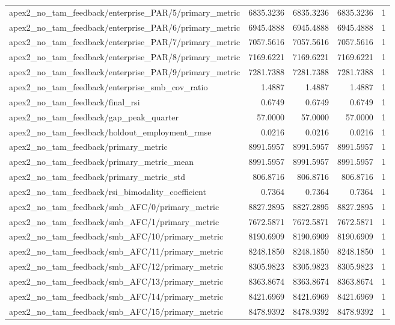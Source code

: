 \begin{table}[h]
\begin{tabular}{lrrrr}
apex2_no_tam_feedback/enterprise_PAR/5/primary_metric & 6835.3236 & 6835.3236 & 6835.3236 & 1 \\
apex2_no_tam_feedback/enterprise_PAR/6/primary_metric & 6945.4888 & 6945.4888 & 6945.4888 & 1 \\
apex2_no_tam_feedback/enterprise_PAR/7/primary_metric & 7057.5616 & 7057.5616 & 7057.5616 & 1 \\
apex2_no_tam_feedback/enterprise_PAR/8/primary_metric & 7169.6221 & 7169.6221 & 7169.6221 & 1 \\
apex2_no_tam_feedback/enterprise_PAR/9/primary_metric & 7281.7388 & 7281.7388 & 7281.7388 & 1 \\
apex2_no_tam_feedback/enterprise_smb_cov_ratio & 1.4887 & 1.4887 & 1.4887 & 1 \\
apex2_no_tam_feedback/final_rsi & 0.6749 & 0.6749 & 0.6749 & 1 \\
apex2_no_tam_feedback/gap_peak_quarter & 57.0000 & 57.0000 & 57.0000 & 1 \\
apex2_no_tam_feedback/holdout_employment_rmse & 0.0216 & 0.0216 & 0.0216 & 1 \\
apex2_no_tam_feedback/primary_metric & 8991.5957 & 8991.5957 & 8991.5957 & 1 \\
apex2_no_tam_feedback/primary_metric_mean & 8991.5957 & 8991.5957 & 8991.5957 & 1 \\
apex2_no_tam_feedback/primary_metric_std & 806.8716 & 806.8716 & 806.8716 & 1 \\
apex2_no_tam_feedback/rsi_bimodality_coefficient & 0.7364 & 0.7364 & 0.7364 & 1 \\
apex2_no_tam_feedback/smb_AFC/0/primary_metric & 8827.2895 & 8827.2895 & 8827.2895 & 1 \\
apex2_no_tam_feedback/smb_AFC/1/primary_metric & 7672.5871 & 7672.5871 & 7672.5871 & 1 \\
apex2_no_tam_feedback/smb_AFC/10/primary_metric & 8190.6909 & 8190.6909 & 8190.6909 & 1 \\
apex2_no_tam_feedback/smb_AFC/11/primary_metric & 8248.1850 & 8248.1850 & 8248.1850 & 1 \\
apex2_no_tam_feedback/smb_AFC/12/primary_metric & 8305.9823 & 8305.9823 & 8305.9823 & 1 \\
apex2_no_tam_feedback/smb_AFC/13/primary_metric & 8363.8674 & 8363.8674 & 8363.8674 & 1 \\
apex2_no_tam_feedback/smb_AFC/14/primary_metric & 8421.6969 & 8421.6969 & 8421.6969 & 1 \\
apex2_no_tam_feedback/smb_AFC/15/primary_metric & 8478.9392 & 8478.9392 & 8478.9392 & 1 \\

\end{tabular}
\end{table}

